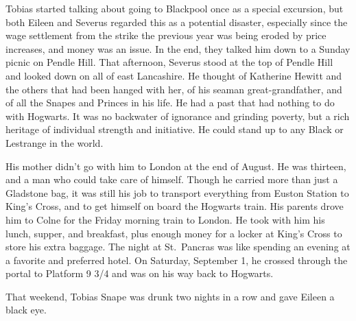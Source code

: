 Tobias started talking about going to Blackpool once as a special excursion, but both Eileen and Severus regarded this as a potential disaster, especially since the wage settlement from the strike the previous year was being eroded by price increases, and money was an issue. In the end, they talked him down to a Sunday picnic on Pendle Hill. That afternoon, Severus stood at the top of Pendle Hill and looked down on all of east Lancashire. He thought of Katherine Hewitt and the others that had been hanged with her, of his seaman great-grandfather, and of all the Snapes and Princes in his life. He had a past that had nothing to do with Hogwarts. It was no backwater of ignorance and grinding poverty, but a rich heritage of individual strength and initiative. He could stand up to any Black or Lestrange in the world.

His mother didn't go with him to London at the end of August. He was thirteen, and a man who could take care of himself. Though he carried more than just a Gladstone bag, it was still his job to transport everything from Euston Station to King's Cross, and to get himself on board the Hogwarts train. His parents drove him to Colne for the Friday morning train to London. He took with him his lunch, supper, and breakfast, plus enough money for a locker at King's Cross to store his extra baggage. The night at St.~Pancras was like spending an evening at a favorite and preferred hotel. On Saturday, September 1, he crossed through the portal to Platform 9 3/4 and was on his way back to Hogwarts.

That weekend, Tobias Snape was drunk two nights in a row and gave Eileen a black eye.


